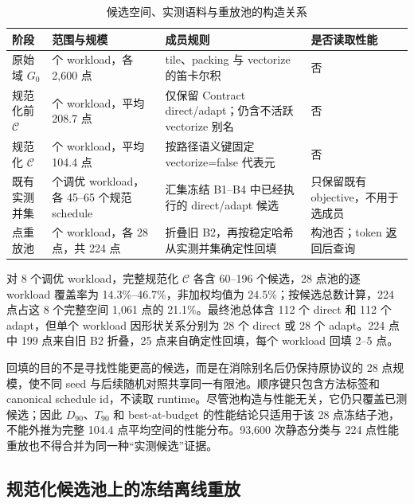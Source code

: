 \begin{table}[!htbp]
  \centering
  \caption{候选空间、实测语料与重放池的构造关系}
  \label{tab:chapter5-pool-construction}
  \begin{tabularx}{\textwidth}{
    @{}
    >{\raggedright\arraybackslash}p{}
    >{\raggedright\arraybackslash}p{}
    >{\raggedright\arraybackslash}p{}
    >{\raggedright\arraybackslash}X
    @{}
  }
    \toprule
    \textbf{阶段} & \textbf{范围与规模} & \textbf{成员规则} & \textbf{是否读取性能} \\
    \midrule
    原始域 $G_0$ & 36 个 workload，各 2,600 点 & tile、packing 与 vectorize 的笛卡尔积 & 否 \\
    规范化前 $\mathcal{C}$ & 36 个 workload，平均 208.7 点 & 仅保留 Contract direct/adapt；仍含不活跃 vectorize 别名 & 否 \\
    规范化 $\mathcal{C}$ & 36 个 workload，平均 104.4 点 & 按路径语义键固定 vectorize=false 代表元 & 否 \\
    既有实测并集 & 8 个调优 workload，各 45--65 个规范 schedule & 汇集冻结 B1--B4 中已经执行的 direct/adapt 候选 & 只保留既有 objective，不用于选成员 \\
    28 点重放池 & 8 个 workload，各 28 点，共 224 点 & 折叠旧 B2，再按稳定哈希从实测并集确定性回填 & 构池否；token 返回后查询 \\
    \bottomrule
  \end{tabularx}
\end{table}

对 8 个调优 workload，完整规范化 $\mathcal{C}$ 各含 60--196 个候选，28 点池的逐 workload 覆盖率为 14.3\%--46.7\%，非加权均值为 24.5\%；按候选总数计算，224 点占这 8 个完整空间 1,061 点的 21.1\%。最终池总体含 112 个 direct 和 112 个 adapt，但单个 workload 因形状关系分别为 28 个 direct 或 28 个 adapt。224 点中 199 点来自旧 B2 折叠，25 点来自确定性回填，每个 workload 回填 2--5 点。

回填的目的不是寻找性能更高的候选，而是在消除别名后仍保持原协议的 28 点规模，使不同 seed 与后续随机对照共享同一有限池。顺序键只包含方法标签和 canonical schedule id，不读取 runtime。尽管池构造与性能无关，它仍只覆盖已测候选；因此 $D_{90}$、$T_{90}$ 和 best-at-budget 的性能结论只适用于该 28 点冻结子池，不能外推为完整 104.4 点平均空间的性能分布。93,600 次静态分类与 224 点性能重放也不得合并为同一种“实测候选”证据。

\subsection{规范化候选池上的冻结离线重放}

